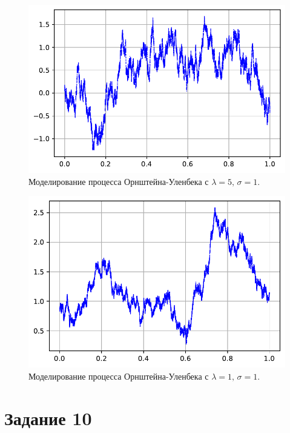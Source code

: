 \documentclass[16pt]{article}
\begin{document}
\begin{figure}
	\center
	\includegraphics[scale=0.7]{9_2.pdf}
	\caption{Моделирование процесса Орнштейна-Уленбека с $\lambda = 5,\, \sigma = 1$.}
\end{figure}

\begin{figure}
	\center
	\includegraphics[scale=0.7]{9_3.pdf}
	\caption{Моделирование процесса Орнштейна-Уленбека с $\lambda = 1,\, \sigma = 1$.}
\end{figure}
\section{Задание 10}
\end{document}
